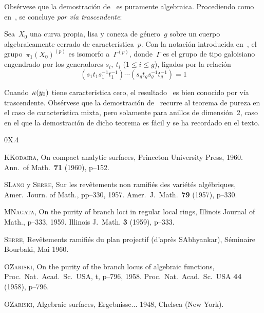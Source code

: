 Obsérvese que la demostración de~ es puramente algebraica.
Procediendo como en~, se concluye \emph{por vía trascendente}:

\begin{corollaire}
\label{X.3.10}
Sea~$X_0$ una curva propia, lisa y conexa de género~$g$ sobre un cuerpo
algebraicamente cerrado de característica~$p$. Con la notación introducida
en~, el grupo~$\pi_1(X_0)^{(p)}$ es isomorfo a~$\Gamma^{(p)}$,
donde~$\Gamma$ es el grupo de tipo galoisiano engendrado por los generadores
$s_i,~t_i$ ($1\le i\le g$), ligados por la relación
$$
(s_1t_1s_1^{-1}t_1^{-1})\cdots (s_gt_gs_g^{-1}t_g^{-1})=1
$$
\end{corollaire}

\begin{remarques}
\label{X.3.11}
Cuando~$\kappa(y_0)$ tiene característica cero, el resultado~ es bien
conocido por vía trascendente. Obsérvese que la demostración de~
recurre al teorema de pureza en el caso de característica mixta, pero
solamente para anillos de dimensión~2, caso en el que la demostración de dicho
teorema es fácil y se ha recordado en el texto.
\end{remarques}

\begin{sgabibliography}{0}{X.4}

 K\ptbl \textsc{Kodaira}, On compact analytic surfaces,
{Princeton University Press, 1960.}
{Ann.\ of Math.\ \textbf{71} (1960), p--152.}

 S\ptbl \textsc{Lang} y
%
\textsc{Serre}, Sur les rev\^etements non ramifi\'es des vari\'et\'es
alg\'ebriques,
{Amer.\ Journ. of Math., pp--330, 1957.}
{Amer.\ J.\ Math.\ \textbf{79} (1957), p--330.}

 M\ptbl \textsc{Nagata},
On the purity of branch loci in regular local rings,
{Illinois Journal of Math., p--333, 1959.}
{Illinois J.\ Math. \textbf{3} (1959), p--333.}

%
\textsc{Serre}, Rev\^etements ramifi\'es du plan projectif (d'apr\`es
S\ptbl Abhyankar), S\'eminaire Bourbaki, Mai 1960.

 O\ptbl \textsc{Zariski},
On the purity of the branch locus of algebraic functions,
{Proc.\ Nat.\ Acad.\ Sc.\ USA, t, p--796, 1958.}
{Proc.\ Nat.\ Acad.\ Sc.\ USA  \textbf{44} (1958), p--796.}

 O\ptbl \textsc{Zariski},
Algebraic surfaces, Ergebnisse... 1948, Chelsea (New York).
\end{sgabibliography}
